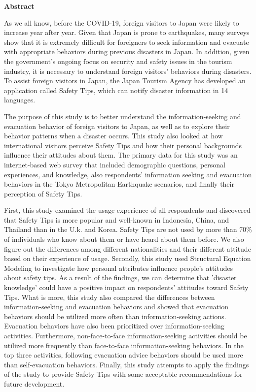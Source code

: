 
\begin{center}\textbf{Abstract}\end{center}

As we all know, before the COVID-19, foreign visitors to Japan were likely to increase year after year. Given that Japan is prone to earthquakes, many surveys show that it is extremely difficult for foreigners to seek information and evacuate with appropriate behaviors during previous disasters in Japan. In addition, given the government's ongoing focus on security and safety issues in the tourism industry, it is necessary to understand foreign visitors' behaviors during disasters. To assist foreign visitors in Japan, the Japan Tourism Agency has developed an application called Safety Tips, which can notify disaster information in 14 languages.

The purpose of this study is to better understand the information-seeking and evacuation behavior of foreign visitors to Japan, as well as to explore their behavior patterns when a disaster occurs. This study also looked at how international visitors perceive Safety Tips and how their personal backgrounds influence their attitudes about them. The primary data for this study was an internet-based web survey that included demographic questions, personal experiences, and knowledge, also respondents’ information seeking and evacuation behaviors in the Tokyo Metropolitan Earthquake scenarios, and finally their perception of Safety Tips. 

First, this study examined the usage experience of all respondents and discovered that Safety Tips is more popular and well-known in Indonesia, China, and Thailand than in the U.k. and Korea. Safety Tips are not used by more than 70\% of individuals who know about them or have heard about them before. We also figure out the differences among different nationalities and their different attitude based on their experience of usage. Secondly, this study used Structural Equation Modeling to investigate how personal attributes influence people's attitudes about safety tips. As a result of the findings, we can determine that 'disaster knowledge' could have a positive impact on respondents' attitudes toward Safety Tips. What is more, this study also compared the differences between information-seeking and evacuation behaviors and showed that evacuation behaviors should be utilized more often than information-seeking actions. Evacuation behaviors have also been prioritized over information-seeking activities. Furthermore, non-face-to-face information-seeking activities should be utilized more frequently than face-to-face information-seeking behaviors. In the top three activities, following evacuation advice behaviors should be used more than self-evacuation behaviors. Finally, this study attempts to apply the findings of the study to provide Safety Tips with some acceptable recommendations for future development. 

\cleardoublepage
